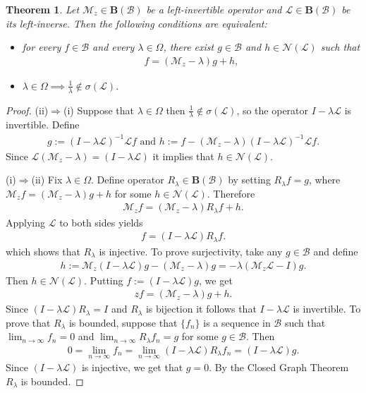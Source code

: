 \documentclass[reqno]{amsproc}
\numberwithin{equation}{section}
\newtheorem{theorem}{Theorem}[section]
\theoremstyle{remark}
\newcommand*{\nul}{\mathscr{N}}
\newcommand*{\bou}{\boldsymbol{B}}
\theoremstyle{definition}
\newcommand{\lein}{\mathcal{L}}
\newcommand{\mul}{\mathcal{M}_z}
\newcommand{\bspace}{\mathcal{B}}
\begin{document}
\begin{theorem}
    Let $\mul\in \bou(\bspace)$ be a left-invertible operator and $\lein\in \bou(\bspace)$ be its left-inverse. 
    Then the following conditions are equivalent:
    \begin{itemize}
        \item[(i)] 
        for every $f\in \bspace$ and every $\lambda\in \varOmega$, there exist $g\in \bspace$ and $h\in \nul(\lein)$ such that
\begin{align*}
    f=(\mul-\lambda)g+h,
\end{align*}
        \item[(ii)] $\lambda\in \varOmega\implies \frac{1}{\lambda}\notin \sigma(\lein)$.
    \end{itemize}
\end{theorem}
\begin{proof}
    (ii)$\Rightarrow$(i)
    Suppose that $\lambda \in \varOmega$ then $\frac{1}{\lambda} \notin \sigma(\lein)$, so the operator $I - \lambda \lein$ is invertible.
Define
\begin{align*}
     g:=(I-\lambda\lein)^{-1}\lein f\text{ and } h:=f-(\mul-\lambda)(I-\lambda\lein)^{-1}\lein f.
\end{align*}
   Since $\lein(\mul-\lambda)=(I-\lambda\lein)$ it implies that $h\in \nul(\lein)$.

    (i)$\Rightarrow$(ii) Fix $\lambda\in \varOmega$. Define operator $R_\lambda\in \bou(\bspace)$ by setting $R_\lambda f = g$, where $\mul f=(\mul-\lambda)g+h$ for some $h\in \nul(\lein)$. Therefore
    \begin{align*}
        \mul f = (\mul-\lambda)R_\lambda f +h.
    \end{align*}
 Applying  $\lein$ to both sides yields
 \begin{align*}
     f = (I-\lambda\lein)R_\lambda f.
 \end{align*}
 which shows that $R_\lambda$ is injective. To prove surjectivity, take any $g\in \bspace$ and define
 \begin{align*}
     h := \mul(I-\lambda\lein)g-(\mul-\lambda)g=-\lambda(\mul\lein-I)g.
 \end{align*}
 Then $h\in \nul(\lein)$. Putting $f := (I-\lambda\lein)g$, we get 
 \begin{align*}
     zf=(\mul-\lambda)g+h.
 \end{align*}
 Since $(I-\lambda\lein)R_\lambda=I$ and $R_\lambda$ is bijection it follows that $I-\lambda\lein$ is invertible. To prove that $R_\lambda$ is bounded, suppose that $\{f_n\}$ is a sequence in $\bspace$ such that $\lim_{n\to \infty}f_n=0$ and $\lim_{n\to \infty}R_\lambda f_n=g$ for some $g\in \bspace$. Then
 \begin{align*}
     0=\lim_{n\to \infty}f_n=\lim_{n\to \infty}(I-\lambda\lein)R_\lambda f_n=(I-\lambda\lein)g.
 \end{align*} Since $(I-\lambda\lein)$ is injective, we get that $g=0$. By the Closed Graph Theorem $R_\lambda$ is bounded.
\end{proof}
\end{document}
